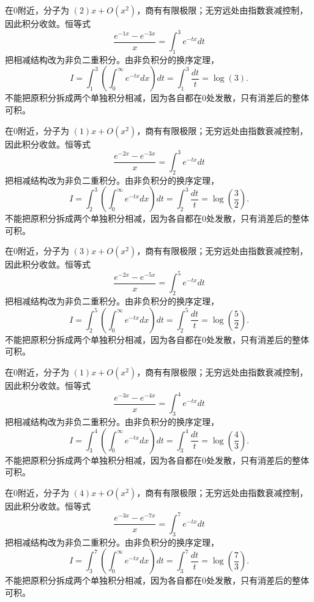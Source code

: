 \documentclass[12pt,fontset=fandol]{ctexart}
\begin{document}
\begin{solve}\label{ans:c20q14}
在0附近，分子为 $(2)x+O(x^2)$，商有有限极限；无穷远处由指数衰减控制，因此积分收敛。恒等式
\[
\frac{e^{-1x}-e^{-3x}}x=\int_{1}^{3}e^{-tx}dt
\]
把相减结构改为非负二重积分。由非负积分的换序定理，
\[
I=\int_{1}^{3}\left(\int_0^\infty e^{-tx}dx\right)dt=\int_{1}^{3}\frac{dt}t=\log(3).
\]
不能把原积分拆成两个单独积分相减，因为各自都在0处发散，只有消差后的整体可积。
\end{solve}

\begin{solve}\label{ans:c20q15}
在0附近，分子为 $(1)x+O(x^2)$，商有有限极限；无穷远处由指数衰减控制，因此积分收敛。恒等式
\[
\frac{e^{-2x}-e^{-3x}}x=\int_{2}^{3}e^{-tx}dt
\]
把相减结构改为非负二重积分。由非负积分的换序定理，
\[
I=\int_{2}^{3}\left(\int_0^\infty e^{-tx}dx\right)dt=\int_{2}^{3}\frac{dt}t=\log(\frac{3}{2}).
\]
不能把原积分拆成两个单独积分相减，因为各自都在0处发散，只有消差后的整体可积。
\end{solve}

\begin{solve}\label{ans:c20q16}
在0附近，分子为 $(3)x+O(x^2)$，商有有限极限；无穷远处由指数衰减控制，因此积分收敛。恒等式
\[
\frac{e^{-2x}-e^{-5x}}x=\int_{2}^{5}e^{-tx}dt
\]
把相减结构改为非负二重积分。由非负积分的换序定理，
\[
I=\int_{2}^{5}\left(\int_0^\infty e^{-tx}dx\right)dt=\int_{2}^{5}\frac{dt}t=\log(\frac{5}{2}).
\]
不能把原积分拆成两个单独积分相减，因为各自都在0处发散，只有消差后的整体可积。
\end{solve}

\begin{solve}\label{ans:c20q17}
在0附近，分子为 $(1)x+O(x^2)$，商有有限极限；无穷远处由指数衰减控制，因此积分收敛。恒等式
\[
\frac{e^{-3x}-e^{-4x}}x=\int_{3}^{4}e^{-tx}dt
\]
把相减结构改为非负二重积分。由非负积分的换序定理，
\[
I=\int_{3}^{4}\left(\int_0^\infty e^{-tx}dx\right)dt=\int_{3}^{4}\frac{dt}t=\log(\frac{4}{3}).
\]
不能把原积分拆成两个单独积分相减，因为各自都在0处发散，只有消差后的整体可积。
\end{solve}

\begin{solve}\label{ans:c20q18}
在0附近，分子为 $(4)x+O(x^2)$，商有有限极限；无穷远处由指数衰减控制，因此积分收敛。恒等式
\[
\frac{e^{-3x}-e^{-7x}}x=\int_{3}^{7}e^{-tx}dt
\]
把相减结构改为非负二重积分。由非负积分的换序定理，
\[
I=\int_{3}^{7}\left(\int_0^\infty e^{-tx}dx\right)dt=\int_{3}^{7}\frac{dt}t=\log(\frac{7}{3}).
\]
不能把原积分拆成两个单独积分相减，因为各自都在0处发散，只有消差后的整体可积。
\end{solve}
\end{document}
